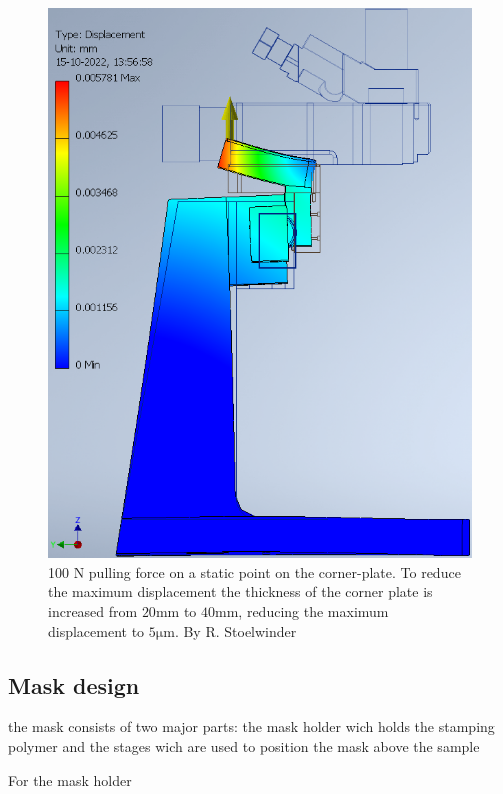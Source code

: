 \documentclass[11pt]{article}
\begin{document}
\begin{figure}[H]
\begin{minipage}[b]{0.45\textwidth}
    \includegraphics[width=1\textwidth]{img/rigidity_simulation/study_10.png}
    \caption{100 N pulling force on a static point on the corner-plate. To reduce the maximum displacement the thickness of the corner plate is increased from  $20\mathrm{mm}$ to $40\mathrm{mm}$, reducing the maximum displacement to $5\mathrm{\mu m}$. By R. Stoelwinder }
    \label{fig:disp_study10}
  \end{minipage}
\end{figure}

\subsection{Mask design}
the mask consists of two major parts: the mask holder wich holds the stamping polymer and the stages wich are used to position the mask above the sample

For the mask holder 
\end{document}
